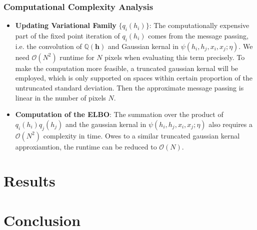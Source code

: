 \documentclass[conference]{IEEEtran}
\newcommand{\QQ}{{\mathbb{Q}}}
\newcommand{\hb}{\mathbf{h}}
\newcommand{\Ocal}{\mathcal{O}}
\begin{document}
\subsubsection{Computational Complexity Analysis}


\begin{itemize}
\item {\textbf{Updating Variational Family}} $\{q_i(h_i)\}$:
The computationally expensive part of the fixed point iteration of $q_i(h_i)$
comes from the message passing, i.e. the convolution of $\QQ(\hb)$ and
Gaussian kernal in $\psi(h_i, h_j, x_i, x_j; \eta)$. We need $\Ocal(N^2)$
runtime for $N$ pixels when evaluating this term precisely.
To make the computation more feasible, a truncated gaussian kernal will be
employed, which is only supported on spaces within certain proportion of
the untruncated standard deviation. Then the approximate message passing is
linear in the number of pixels $N$.
\item {\textbf{Computation of the ELBO}}: The summation over the product of
$q_i(h_i)q_j(h_j)$ and the gaussian kernal in $\psi(h_i, h_j, x_i, x_j; \eta)$
also requires a $\Ocal(N^2)$ complexity in time.
Owes to a similar truncated gaussian kernal approxiamtion, the runtime can
be reduced to $\Ocal(N)$.
\end{itemize}


\section{Results}


\section{Conclusion}





\end{document}
